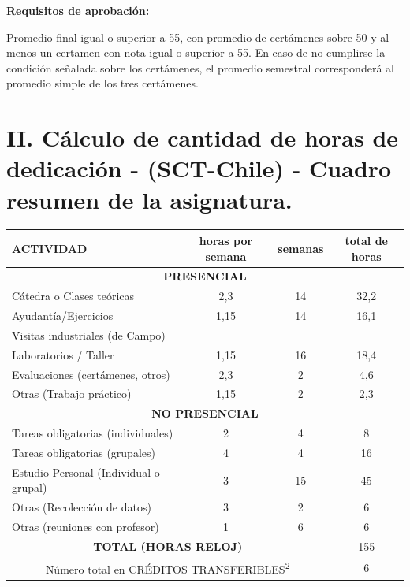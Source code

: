 \documentclass[10pt,a4paper]{article}
\begin{document}
{\bf Requisitos de aprobación:}

Promedio final igual o superior a 55, con promedio de certámenes sobre 50 y al menos un certamen con nota igual o superior a 55.  En caso de no cumplirse la condición señalada sobre los certámenes, el promedio semestral corresponderá al promedio simple de los tres certámenes.
\newpage

\section*{ II. Cálculo de cantidad de horas de dedicación - (SCT-Chile) - Cuadro resumen de la asignatura.}

\begin{table}[h]
    \centering
    \begin{tabular}{|p{5cm}|c|c|c|}
        \hline
        \textbf{ACTIVIDAD} & \textbf{horas por semana} & \textbf{semanas} & \textbf{total de horas} \\
        \hline
        \multicolumn{4}{|c|}{\textbf{PRESENCIAL}} \\
        \hline
        Cátedra o Clases teóricas & 2,3 & 14 & 32,2 \\
        \hline
        Ayudantía/Ejercicios & 1,15 & 14 & 16,1 \\
        \hline
        Visitas industriales (de Campo) & & & \\
        \hline
        Laboratorios / Taller & 1,15 & 16 & 18,4 \\
        \hline
        Evaluaciones (certámenes, otros) & 2,3 & 2 & 4,6 \\
        \hline
        Otras (Trabajo práctico) & 1,15 & 2 & 2,3 \\
        \hline
        \multicolumn{4}{|c|}{\textbf{NO PRESENCIAL}} \\
        \hline
        Tareas obligatorias (individuales) & 2 & 4 & 8 \\
        \hline
        Tareas obligatorias (grupales) & 4 & 4 & 16 \\
        \hline
        Estudio Personal (Individual o grupal) & 3 & 15 & 45 \\
        \hline
        Otras (Recolección de datos) & 3 & 2 & 6 \\
        \hline
        Otras (reuniones con profesor) & 1 & 6 & 6 \\
        \hline
        \multicolumn{3}{|c|}{\textbf{TOTAL (HORAS RELOJ)}} & 155\\
        \hline
        \multicolumn{3}{|c|}{Número total en CRÉDITOS TRANSFERIBLES\textsuperscript{2}} &  6 \\
        \hline
    \end{tabular}
\end{table}
\end{document}
